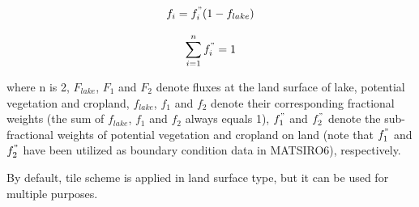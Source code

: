 \begin{eqnarray}
f_i=f_i^"(1-f_{lake})
\end{eqnarray}

\begin{eqnarray}
\sum_{i=1}^nf_i^"=1
\end{eqnarray}

where n is 2, \(F_{lake}\), \(F_1\) and \(F_2\) denote fluxes at the land surface of lake, potential vegetation and cropland, \(f_{lake}\), \(f_1\) and \(f_2\) denote their corresponding fractional
weights (the sum of \(f_{lake}\), \(f_1\) and \(f_2\) always equals 1), \(f_1^"\) and \(f_2^"\) denote the sub-fractional weights of potential vegetation and cropland on land (note that \(f_1^"\) and
\(f_2^"\) have been utilized as boundary condition data in MATSIRO6), respectively.

By default, tile scheme is applied in land surface type, but it can be used for multiple purposes.
